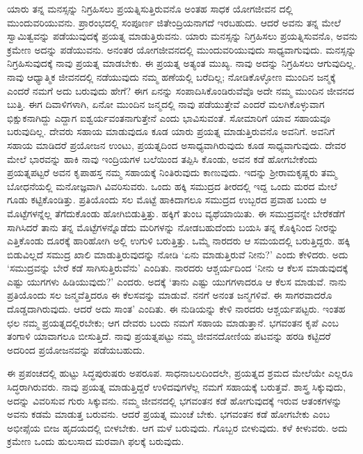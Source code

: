 ಯಾರು ತನ್ನ ಮನಸ್ಸನ್ನು ನಿಗ್ರಹಿಸಲು ಪ್ರಯತ್ನಿಸುತ್ತಿರುವನೊ ಅಂತಹ ಸಾಧಕ ಯೋಗಜೀವನ ದಲ್ಲಿ ಮುಂದುವರಿಯುವನು. ಪ್ರಾರಂಭದಲ್ಲಿ ಸಂಪೂರ್ಣ ಜಿತೇಂದ್ರಿಯನಾಗದೆ ಇರಬಹುದು. ಆದರೆ ಅವನು ತನ್ನ ಮೇಲೆ ಸ್ವಾಮಿತ್ವವನ್ನು ಪಡೆಯುವುದಕ್ಕೆ ಪ್ರಯತ್ನ ಮಾಡುತ್ತಿರುವನು. ಯಾರು ಮನಸ್ಸನ್ನು ನಿಗ್ರಹಿಸಲು ಪ್ರಯತ್ನಿಸುವನೊ, ಅವನು ಕ್ರಮೇಣ ಅದನ್ನು ಪಡೆಯುವನು. ಅನಂತರ ಯೋಗಜೀವನದಲ್ಲಿ ಮುಂದುವರಿಯುವುದು ಸಾಧ್ಯವಾಗುವುದು. ಮನಸ್ಸನ್ನು ನಿಗ್ರಹಿಸುವುದಕ್ಕೆ ನಾವು ಪ್ರಯತ್ನ ಮಾಡಬೇಕು. ಈ ಪ್ರಯತ್ನ ಅತ್ಯಂತ ಮುಖ್ಯ. ನಾವು ಅದನ್ನು ನಿಗ್ರಹಿಸಲು ಆಗುವುದಿಲ್ಲ. ನಾವು ಆಧ್ಯಾತ್ಮಿಕ ಜೀವನದಲ್ಲಿ ನಡೆಯುವುದು ನಮ್ಮ ಹಣೆಯಲ್ಲಿ ಬರೆದಿಲ್ಲ; ನೋಡಿಕೊಳ್ಳೋಣ ಮುಂದಿನ ಜನ್ಮಕ್ಕೆ ಎಂದರೆ ನಮಗೆ ಅದು ಬರುವುದು ಹೇಗೆ? ಈಗ ಏನನ್ನು ಸಂಪಾದಿಸಿಕೊಂಡಿರುವೆವೊ ಅದೇ ನಮ್ಮ ಮುಂದಿನ ಜೀವನದ ಬುತ್ತಿ. ಈಗ ದಿವಾಳಿಗಳಾಗಿ, ಏನೋ ಮುಂದಿನ ಜನ್ಮದಲ್ಲಿ ನಾವು ಪಡೆಯುತ್ತೇವೆ ಎಂದರೆ ಮಲಗಿಕೊಳ್ಳುವಾಗ ಭಿಕ್ಷುಕನಾಗಿದ್ದು ಎದ್ದಾಗ ಐಶ್ವರ್ಯವಂತನಾಗುತ್ತೇನೆ ಎಂದು ಭಾವಿಸುವಂತೆ. ಸೋಮಾರಿಗೆ ಯಾವ ಸಹಾಯವೂ ಬರುವುದಿಲ್ಲ. ದೇವರು ಸಹಾಯ ಮಾಡುವುದೂ ಕೂಡ ಯಾರು ಪ್ರಯತ್ನ ಮಾಡುತ್ತಿರುವನೊ ಅವನಿಗೆ. ಅವನಿಗೆ ಸಹಾಯ ಮಾಡಿದರೆ ಪ್ರಯೋಜನ ಉಂಟು, ಪ್ರಯತ್ನದಿಂದ ಅಸಾಧ್ಯವಾಗಿರುವುದು ಕೂಡ ಸಾಧ್ಯವಾಗುವುದು. ದೇವರ ಮೇಲೆ ಭಾರವನ್ನು ಹಾಕಿ ನಾವು ಇಂದ್ರಿಯಗಳ ಬಲೆಯಿಂದ ತಪ್ಪಿಸಿ ಕೊಂಡು, ಅವನ ಕಡೆ ಹೋಗಬೇಕೆಂದು ಪ್ರಯತ್ನಪಟ್ಟರೆ ಅವನ ಕೃಪಾಹಸ್ತ ನಮ್ಮ ಸಹಾಯಕ್ಕೆ ನಿಂತಿರುವುದು ಕಾಣುವುದು. ಇದನ್ನು ಶ್ರೀರಾಮಕೃಷ್ಣರು ತಮ್ಮ ಬೋಧನೆಯಲ್ಲಿ ಮನೋಜ್ಞವಾಗಿ ವಿವರಿಸುವರು. ಒಂದು ಹಕ್ಕಿ ಸಮುದ್ರದ ತೀರದಲ್ಲಿ ಇದ್ದ ಒಂದು ಮರದ ಮೇಲೆ ಗೂಡು ಕಟ್ಟಿಕೊಂಡಿತ್ತು. ಪ್ರತಿಯೊಂದು ಸಲ ಮೊಟ್ಟೆ ಹಾಕಿದಾಗಲೂ ಸಮುದ್ರದ ಉಬ್ಬರದ ಪ್ರವಾಹ ಬಂದು ಆ ಮೊಟ್ಟೆಗಳನ್ನೆಲ್ಲ ತೆಗೆದುಕೊಂಡು ಹೋಗಿಬಿಡುತ್ತಿತ್ತು. ಹಕ್ಕಿಗೆ ತುಂಬ ವ್ಯಥೆಯಾಯಿತು. ಈ ಸಮುದ್ರವನ್ನೇ ಬೇರೆಕಡೆಗೆ ಸಾಗಿಸಿದರೆ ತಾನು ತನ್ನ ಮೊಟ್ಟೆಗಳನ್ನೊಡೆದು ಮರಿಗಳನ್ನು ನೋಡಬಹುದೆಂದು ಬಯಸಿ ತನ್ನ ಕೊಕ್ಕಿನಿಂದ ನೀರನ್ನು ಎತ್ತಿಕೊಂಡು ದೂರಕ್ಕೆ ಹಾರಿಹೋಗಿ ಅಲ್ಲಿ ಉಗುಳಿ ಬರುತ್ತಿತ್ತು. ಒಮ್ಮೆ ನಾರದರು ಆ ಸಮಯದಲ್ಲಿ ಬರುತ್ತಿದ್ದರು. ಹಕ್ಕಿ ಬಿಡುವಿಲ್ಲದೆ ಸಮುದ್ರ ಖಾಲಿ ಮಾಡುತ್ತಿರುವುದನ್ನು ನೋಡಿ ‘ಏನು ಮಾಡುತ್ತಿರುವೆ ನೀನು?’ ಎಂದು ಕೇಳಿದರು. ಅದು ‘ಸಮುದ್ರವನ್ನು ಬೇರೆ ಕಡೆ ಸಾಗಿಸುತ್ತಿರುವೆನು’ ಎಂದಿತು. ನಾರದರು ಆಶ್ಚರ್ಯದಿಂದ ‘ನೀನು ಆ ಕೆಲಸ ಮಾಡುವುದಕ್ಕೆ ಎಷ್ಟು ಯುಗಗಳು ಹಿಡಿಯುವುದು?’ ಎಂದರು. ಅದಕ್ಕೆ ‘ತಾನು ಎಷ್ಟು ಯುಗಗಳಾದರೂ ಆ ಕೆಲಸ ಮಾಡುವೆ. ನಾನು ಪ್ರತಿಯೊಂದು ಸಲ ಜನ್ಮವೆತ್ತಿದರೂ ಈ ಕೆಲಸವನ್ನು ಮಾಡುವೆ. ನನಗೆ ಅನಂತ ಜನ್ಮಗಳಿವೆ. ಈ ಸಾಗರವಾದರೊ ದೊಡ್ಡದಾಗಿರುವುದು. ಆದರೆ ಅದು ಸಾಂತ’ ಎಂದಿತು. ಈ ನುಡಿಯನ್ನು ಕೇಳಿ ನಾರದರು ಆಶ್ಚರ್ಯಪಟ್ಟರು. ಇಂತಹ ಛಲ ನಮ್ಮ ಪ್ರಯತ್ನದಲ್ಲಿರಬೇಕು; ಆಗ ದೇವರು ಬಂದು ನಮಗೆ ಸಹಾಯ ಮಾಡುತ್ತಾನೆ. ಭಗವಂತನ ಕೃಪೆ ಎಂಬ ತಂಗಾಳಿ ಯಾವಾಗಲೂ ಬೀಸುತ್ತಿದೆ. ನಾವು ಪ್ರಯತ್ನಪಟ್ಟು ನಮ್ಮ ಜೀವನದೋಣಿಯ ಪಟವನ್ನು ಹರಡಿ ಕಟ್ಟಿದರೆ ಅದರಿಂದ ಪ್ರಯೋಜನವನ್ನು ಪಡೆಯಬಹುದು.

ಈ ಪ್ರಪಂಚದಲ್ಲಿ ಹುಟ್ಟು ಸಿದ್ಧಪುರುಷರು ಅಪರೂಪ. ಸಾಧನಾಬಲದಿಂದಲೇ, ಪ್ರಯತ್ನದ ಶ್ರಮದ ಮೇಲೆಯೇ ಎಲ್ಲರೂ ಸಿದ್ಧರಾಗಿರುವರು. ನಾವು ಪ್ರಯತ್ನ ಮಾಡುತ್ತಿದ್ದರೆ ಉಳಿದವುಗಳೆಲ್ಲ ನಮಗೆ ಸಹಾಯಕ್ಕೆ ಬರುತ್ತವೆ. ಶಾಸ್ತ್ರ ಸಿಕ್ಕುವುದು, ಅದನ್ನು ವಿವರಿಸುವ ಗುರು ಸಿಕ್ಕುವನು. ನಮ್ಮ ಜೀವನದಲ್ಲಿ ಭಗವಂತನ ಕಡೆ ಹೋಗುವುದಕ್ಕೆ ಇರುವ ಆತಂಕಗಳನ್ನು ಅವನು ಕಡಮೆ ಮಾಡುತ್ತ ಬರುವನು. ಆದರೆ ಪ್ರಯತ್ನ ಮುಂಚೆ ಬೇಕು. ಭಗವಂತನ ಕಡೆ ಹೋಗಬೇಕು ಎಂಬ ಅಭೀಪ್ಸೆಯ ಬೀಜ ಹೃದಯದಲ್ಲಿ ಬೀಳಬೇಕು. ಆಗ ಮಳೆ ಬರುವುದು. ಗೊಬ್ಬರ ಬೀಳುವುದು. ಕಳೆ ಕೀಳುವರು. ಅದು ಕ್ರಮೇಣ ಒಂದು ಹುಲುಸಾದ ಮರವಾಗಿ ಫಲಕ್ಕೆ ಬರುವುದು.

